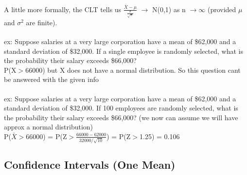 \documentclass[12pt, a4paper]{article}
\begin{document}
	\noindent A little more formally, the CLT tells us $\frac{\bar{X}-\mu}{\frac{\sigma}{\sqrt{n}}}$ $\rightarrow$ N(0,1) as n $\rightarrow\infty$ (provided $\mu$ and $\sigma^2$ are finite). \\~\\
	ex: Suppose salaries at a very large corporation have a mean of \$62,000 and a standard deviation of \$32,000. If a single employee is randomly selected, what is the probability their salary exceeds \$66,000? \\
	P(X$>$66000) but X does not have a normal distribution. So this question cant be answered with the given info \\~\\
	ex: Suppose salaries at a very large corporation have a mean of \$62,000 and a standard deviation of \$32,000. If 100 employees are randomly selected, what is the probability their salary exceeds \$66,000? (we now can assume we will have approx a normal distribution)\\
	P($\bar{X}>$66000) = P(Z$>\frac{66000-62000}{32000/\sqrt{10}}$) = P(Z$>$1.25) = 0.106 \newpage
	
\begin{center} \section{Confidence Intervals (One Mean)} \end{center}
\end{document}
